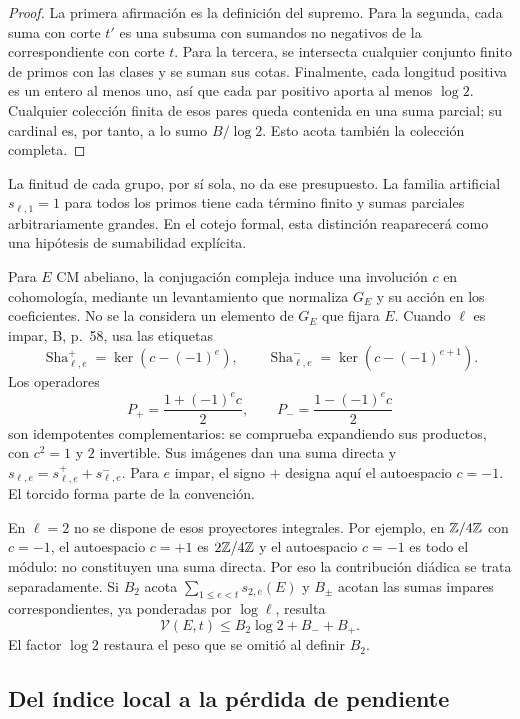 \begin{proof}
La primera afirmación es la definición del supremo.
Para la segunda, cada suma con corte $t'$ es una subsuma
con sumandos no negativos de la correspondiente con corte $t$.
Para la tercera, se intersecta cualquier conjunto finito de
primos con las clases y se suman sus cotas.
Finalmente, cada longitud positiva es un entero al menos uno,
así que cada par positivo aporta al menos $\log2$.
Cualquier colección finita de esos pares queda contenida en
una suma parcial; su cardinal es, por tanto, a lo sumo
$B/\log2$. Esto acota también la colección completa.
\end{proof}

La finitud de cada grupo, por sí sola, no da ese presupuesto.
La familia artificial $s_{\ell,1}=1$ para todos los primos
tiene cada término finito y sumas parciales arbitrariamente
grandes. En el cotejo formal, esta distinción reaparecerá
como una hipótesis de sumabilidad explícita.

Para $E$ CM abeliano, la conjugación compleja induce una
involución $c$ en cohomología, mediante un levantamiento
que normaliza $G_E$ y su acción en los coeficientes.
No se la considera un elemento de $G_E$ que fijara $E$.
Cuando $\ell$ es impar, B, p.~58, usa las etiquetas
\[
 \operatorname{Sha}_{\ell,e}^{+}
   =\ker(c-(-1)^e),\qquad
 \operatorname{Sha}_{\ell,e}^{-}
   =\ker(c-(-1)^{e+1}).
\]
Los operadores
\[
 P_+=\frac{1+(-1)^ec}{2},\qquad
 P_-=\frac{1-(-1)^ec}{2}
\]
son idempotentes complementarios: se comprueba expandiendo
sus productos, con $c^2=1$ y $2$ invertible.
Sus imágenes dan una suma directa y
$s_{\ell,e}=s_{\ell,e}^{+}+s_{\ell,e}^{-}$.
Para $e$ impar, el signo $+$ designa aquí el autoespacio
$c=-1$. El torcido forma parte de la convención.

En $\ell=2$ no se dispone de esos proyectores integrales.
Por ejemplo, en $\mathbb{Z}/4\mathbb{Z}$ con $c=-1$, el autoespacio
$c=+1$ es $2\mathbb{Z}/4\mathbb{Z}$ y el autoespacio $c=-1$ es todo el
módulo: no constituyen una suma directa.
Por eso la contribución diádica se trata separadamente.
Si $B_2$ acota $\sum_{1\le e<t}s_{2,e}(E)$ y
$B_\pm$ acotan las sumas impares correspondientes,
ya ponderadas por $\log\ell$, resulta
\begin{equation}
 \mathcal V(E,t)\le B_2\log2+B_-+B_+.
 \label{eq:cohom-particion}
\end{equation}
El factor $\log2$ restaura el peso que se omitió al
definir $B_2$.

\subsection{Del índice local a la pérdida de pendiente}

